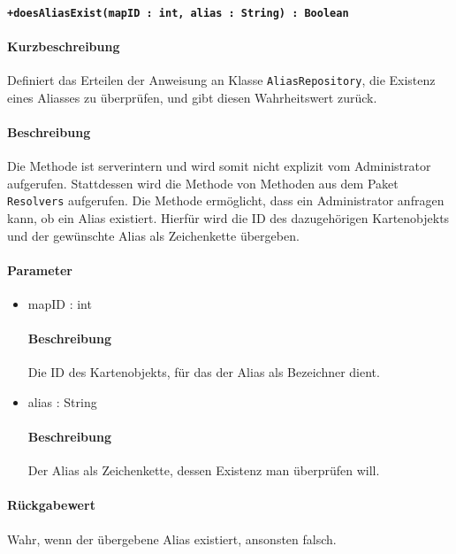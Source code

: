 \paragraph*{\texttt{+doesAliasExist(mapID : int, alias : String) : Boolean}}%
\paragraph*{Kurzbeschreibung}
Definiert das Erteilen der Anweisung an Klasse \texttt{AliasRepository}, die Existenz eines Aliasses zu überprüfen, und gibt diesen Wahrheitswert zurück.
\paragraph*{Beschreibung}
Die Methode ist serverintern und wird somit nicht explizit vom Administrator aufgerufen.
Stattdessen wird die Methode von Methoden aus dem Paket \texttt{Resolvers} aufgerufen.
Die Methode ermöglicht, dass ein Administrator anfragen kann, ob ein Alias existiert.
Hierfür wird die ID des dazugehörigen Kartenobjekts und der gewünschte Alias als Zeichenkette übergeben.
\paragraph*{Parameter}
\begin{itemize}
    \item mapID : int
    		\paragraph*{Beschreibung}
    		Die ID des Kartenobjekts, für das der Alias als Bezeichner dient.
    	\item alias : String
    		\paragraph*{Beschreibung}
    		Der Alias als Zeichenkette, dessen Existenz man überprüfen will.
\end{itemize}
\paragraph*{Rückgabewert}
Wahr, wenn der übergebene Alias existiert, ansonsten falsch.
